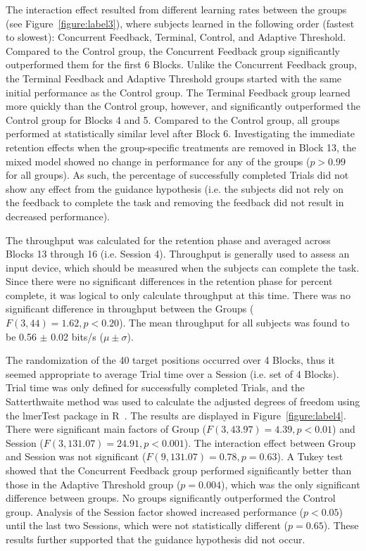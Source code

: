 The interaction effect resulted from different learning rates between the groups (see Figure~\ref{figure:label3}), where subjects learned in the following order (fastest to slowest): Concurrent Feedback, Terminal, Control, and Adaptive Threshold.
Compared to the Control group, the Concurrent Feedback group significantly outperformed them for the first 6 Blocks.
Unlike the Concurrent Feedback group, the Terminal Feedback and Adaptive Threshold groups started with the same initial performance as the Control group.
The Terminal Feedback group learned more quickly than the Control group, however, and significantly outperformed the Control group for Blocks 4 and 5.
Compared to the Control group, all groups performed at statistically similar level after Block 6.
Investigating the immediate retention effects when the group-specific treatments are removed in Block 13, the mixed model showed no change in performance for any of the groups ($p > 0.99$ for all groups).
As such, the percentage of successfully completed Trials did not show any effect from the guidance hypothesis (i.e. the subjects did not rely on the feedback to complete the task and removing the feedback did not result in decreased performance).

The throughput was calculated for the retention phase and averaged across Blocks 13 through 16 (i.e. Session 4).
Throughput is generally used to assess an input device, which should be measured when the subjects can complete the task.
Since there were no significant differences in the retention phase for percent complete, it was logical to only calculate throughput at this time.
There was no significant difference in throughput between the Groups ($F(3, 44) = 1.62, p < 0.20$).
The mean throughput for all subjects was found to be 0.56 $\pm$ 0.02 bits/s ($\mu\pm\sigma$).

The randomization of the 40 target positions occurred over 4 Blocks, thus it seemed appropriate to average Trial time over a Session (i.e. set of 4 Blocks).
Trial time was only defined for successfully completed Trials, and the Satterthwaite method was used to calculate the adjusted degrees of freedom using the lmerTest package in R~\citep{RN53}.
The results are displayed in Figure~\ref{figure:label4}.
There were significant main factors of Group ($F(3, 43.97) = 4.39, p < 0.01$) and Session ($F(3, 131.07) = 24.91, p < 0.001$).
The interaction effect between Group and Session was not significant ($F(9, 131.07) = 0.78, p = 0.63$).
A Tukey test showed that the Concurrent Feedback group performed significantly better than those in the Adaptive Threshold group ($p = 0.004$), which was the only significant difference between groups.
No groups significantly outperformed the Control group.
Analysis of the Session factor showed increased performance ($p < 0.05$) until the last two Sessions, which were not statistically different ($p = 0.65$).
These results further supported that the guidance hypothesis did not occur.

